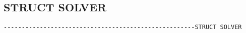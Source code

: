 \subsection{STRUCT SOLVER}
\begin{verbatim}
-----------------------------------------------------STRUCT SOLVER
\end{verbatim}

